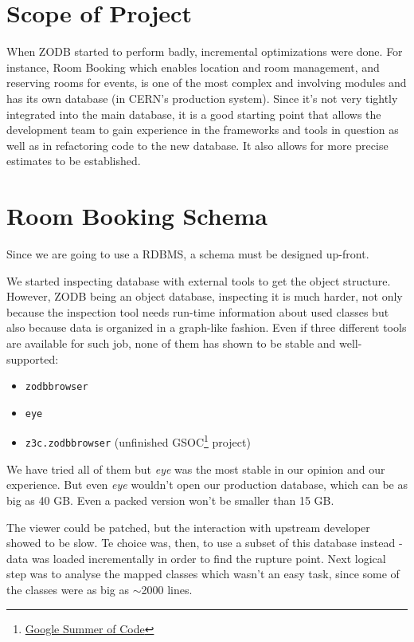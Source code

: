 \section{Scope of Project}

When ZODB started to perform badly, incremental optimizations were done. For instance, Room Booking which enables location and room management, and reserving rooms for events, is one of the most complex and involving modules and has its own database (in CERN's production system). Since it's not very tightly integrated into the main database, it is a good starting point that allows the development team to gain experience in the frameworks and tools in question as well as in refactoring code to the new database. It also allows for more precise estimates to be established.

\section{Room Booking Schema}

Since we are going to use a RDBMS, a schema must be designed up-front.

We started inspecting database with external tools to get the object structure. However, ZODB being an object database, inspecting it is much harder, not only because the inspection tool needs run-time information about used classes but also because data is organized in a graph-like fashion. Even if three different tools are available for such job, none of them has shown to be stable and well-supported:
\begin{itemize}
  \item \texttt{zodbbrowser}
  \item \texttt{eye}
  \item \texttt{z3c.zodbbrowser} (unfinished GSOC\footnote{\href{http://www.google-melange.com/gsoc/homepage/google/gsoc2014}{Google Summer of Code}} project)
\end{itemize}

We have tried all of them but \textit{eye} was the most stable in our opinion and our experience. But even \textit{eye} wouldn't open our production database, which can be as big as 40 GB. Even a packed version won't be smaller than 15 GB.

The viewer could be patched, but the interaction with upstream developer showed to be slow. Te choice was, then, to use a subset of this database instead - data was loaded incrementally in order to find the rupture point. Next logical step was to analyse the mapped classes which wasn't an easy task, since some of the classes were as big as $\sim$2000 lines.

